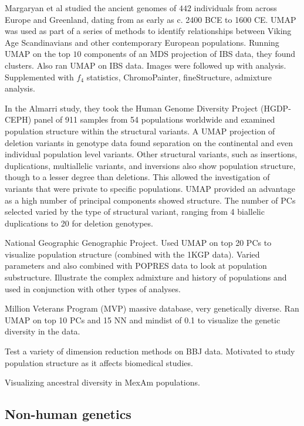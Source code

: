 \documentclass[12pt]{article}
\begin{document}
Margaryan et al\cite{margaryan_population_2019} studied the ancient genomes of $442$ individuals from across Europe and Greenland, dating from as early as c. 2400 BCE to 1600 CE. UMAP was used as part of a series of methods to identify relationships between Viking Age Scandinavians and other contemporary European populations. Running UMAP on the top $10$ components of an MDS projection of IBS data, they found clusters. Also ran UMAP on IBS data. Images were followed up with analysis. Supplemented with $f_4$ statistics, ChromoPainter, fineStructure, admixture analysis.

In the Almarri study, they took the Human Genome Diversity Project (HGDP-CEPH) panel of 911 samples from 54 populations worldwide and examined population structure within the structural variants. A UMAP projection of deletion variants in genotype data found separation on the continental and even individual population level variants. Other structural variants, such as insertions, duplications, multiallelic variants, and inversions also show population structure, though to a lesser degree than deletions. This allowed the investigation of variants that were private to specific populations. UMAP provided an advantage as a high number of principal components showed structure. The number of PCs selected varied by the type of structural variant, ranging from 4 biallelic duplications to 20 for deletion genotypes.\cite{almarri_population_2020}

National Geographic Genographic
Project. Used UMAP on top 20 PCs to visualize population structure (combined with the 1KGP data). Varied parameters and also combined with POPRES data to look at population substructure. Illustrate the complex admixture and history of populations and used in conjunction with other types of analyses.


Million Veterans Program (MVP) massive database, very genetically diverse. Ran UMAP on top 10 PCs and 15 NN  and mindist of 0.1 to visualize the genetic diversity in the data. \cite{hunter-zinck_genotyping_2020}

Test a variety of dimension reduction methods on BBJ data. Motivated to study population structure as it affects biomedical studies.\cite{sakaue_dimensionality_2020}

Visualizing ancestral diversity in MexAm populations.\cite{spear2020recent}

\subsection*{Non-human genetics}
\end{document}
